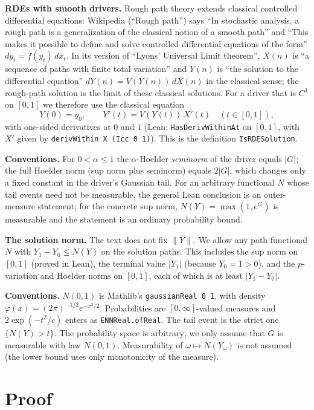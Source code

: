 \documentclass[11pt]{article}
\theoremstyle{remark}
\begin{document}
\textbf{RDEs with smooth drivers.} Rough path theory extends classical controlled differential
equations: Wikipedia (``Rough path'') says ``In stochastic analysis, a rough path is a
generalization of the classical notion of a smooth path'' and ``This makes it possible to define
and solve controlled differential equations of the form'' $dy_t = f(y_t)\,dx_t$. In its version of
``Lyons' Universal Limit theorem'', $X(n)$ is ``a sequence of paths with finite total variation''
and $Y(n)$ is ``the solution to the differential equation'' $dY(n) = V(Y(n))\,dX(n)$ in the
classical sense; the rough-path solution is the limit of these classical solutions. For a driver
that is $C^1$ on $[0,1]$ we therefore use the classical equation
\[
  Y(0) = y_0, \qquad Y'(t) = V(Y(t))\,X'(t) \quad (t \in [0,1]),
\]
with one-sided derivatives at $0$ and $1$ (Lean: \texttt{HasDerivWithinAt} on $[0,1]$, with
$X'$ given by \texttt{derivWithin X (Icc 0 1)}). This is the definition \texttt{IsRDESolution}.

\textbf{Conventions.} For $0<\alpha\le1$ the $\alpha$-Hoelder \emph{seminorm} of the driver equals
$|G|$; the full Hoelder norm (sup norm plus seminorm) equals $2|G|$, which changes only a fixed
constant in the driver's Gaussian tail. For an arbitrary functional $N$ whose tail events need not be
measurable, the general Lean conclusion is an outer-measure statement; for the concrete sup norm,
$N(Y)=\max(1,e^{G})$ is measurable and the statement is an ordinary probability bound.

\textbf{The solution norm.} The text does not fix $\|Y\|$. We allow any path functional $N$ with
$Y_1 - Y_0 \le N(Y)$ on the solution paths. This includes the sup norm on $[0,1]$ (proved in Lean),
the terminal value $|Y_1|$ (because $Y_0 = 1 > 0$), and the $p$-variation and Hoelder norms on
$[0,1]$, each of which is at least $|Y_1 - Y_0|$.

\textbf{Conventions.} $N(0,1)$ is Mathlib's \texttt{gaussianReal 0 1}, with density
$\varphi(x) = (2\pi)^{-1/2}e^{-x^2/2}$. Probabilities are $[0,\infty]$-valued measures and
$2\exp(-t^2/c)$ enters as \texttt{ENNReal.ofReal}. The tail event is the strict one
$\{N(Y) > t\}$. The probability space is arbitrary; we only assume that $G$ is measurable with law
$N(0,1)$. Measurability of $\omega \mapsto N(Y_\omega)$ is not assumed (the lower bound uses only
monotonicity of the measure).

\section{Proof}
\end{document}
